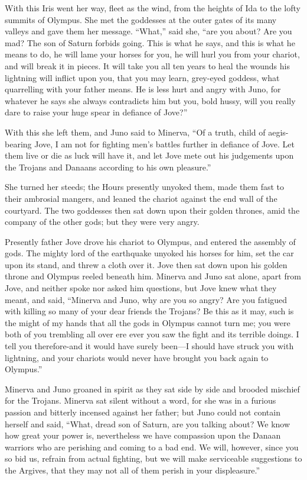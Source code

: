 With this Iris went her way, fleet as the wind, from the heights of Ida to
the lofty summits of Olympus. She met the goddesses at the outer gates of
its many valleys and gave them her message. “What,” said she, “are you
about? Are you mad? The son of Saturn forbids going. This is what he says,
and this is what he means to do, he will lame your horses for you, he will
hurl you from your chariot, and will break it in pieces. It will take you
all ten years to heal the wounds his lightning will inflict upon you, that
you may learn, grey-eyed goddess, what quarrelling with your father means.
He is less hurt and angry with Juno, for whatever he says she always
contradicts him but you, bold hussy, will you really dare to raise your
huge spear in defiance of Jove?”

With this she left them, and Juno said to Minerva, “Of a truth, child of
aegis-bearing Jove, I am not for fighting men’s battles further in
defiance of Jove. Let them live or die as luck will have it, and let Jove
mete out his judgements upon the Trojans and Danaans according to his own
pleasure.”

She turned her steeds; the Hours presently unyoked them, made them fast to
their ambrosial mangers, and leaned the chariot against the end wall of
the courtyard. The two goddesses then sat down upon their golden thrones,
amid the company of the other gods; but they were very angry.

Presently father Jove drove his chariot to Olympus, and entered the
assembly of gods. The mighty lord of the earthquake unyoked his horses for
him, set the car upon its stand, and threw a cloth over it. Jove then sat
down upon his golden throne and Olympus reeled beneath him. Minerva and
Juno sat alone, apart from Jove, and neither spoke nor asked him
questions, but Jove knew what they meant, and said, “Minerva and Juno, why
are you so angry? Are you fatigued with killing so many of your dear
friends the Trojans? Be this as it may, such is the might of my hands that
all the gods in Olympus cannot turn me; you were both of you trembling all
over ere ever you saw the fight and its terrible doings. I tell you
therefore-and it would have surely been—I should have struck you
with lightning, and your chariots would never have brought you back again
to Olympus.”

Minerva and Juno groaned in spirit as they sat side by side and brooded
mischief for the Trojans. Minerva sat silent without a word, for she was
in a furious passion and bitterly incensed against her father; but Juno
could not contain herself and said, “What, dread son of Saturn, are you
talking about? We know how great your power is, nevertheless we have
compassion upon the Danaan warriors who are perishing and coming to a bad
end. We will, however, since you so bid us, refrain from actual fighting,
but we will make serviceable suggestions to the Argives, that they may not
all of them perish in your displeasure.”

